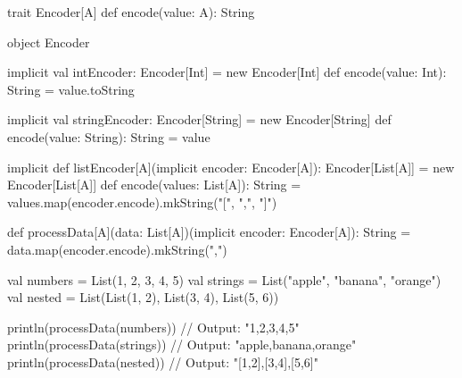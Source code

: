 trait Encoder[A] {
  def encode(value: A): String
}

object Encoder {
  implicit val intEncoder: Encoder[Int] = new Encoder[Int] {
    def encode(value: Int): String = value.toString
  }

  implicit val stringEncoder: Encoder[String] = new Encoder[String] {
    def encode(value: String): String = value
  }

  implicit def listEncoder[A](implicit encoder: Encoder[A]): Encoder[List[A]] = new Encoder[List[A]] {
    def encode(values: List[A]): String = values.map(encoder.encode).mkString("[", ",", "]")
  }
}

def processData[A](data: List[A])(implicit encoder: Encoder[A]): String =
  data.map(encoder.encode).mkString(",")

val numbers = List(1, 2, 3, 4, 5)
val strings = List("apple", "banana", "orange")
val nested = List(List(1, 2), List(3, 4), List(5, 6))

println(processData(numbers)) // Output: "1,2,3,4,5"
println(processData(strings)) // Output: "apple,banana,orange"
println(processData(nested)) // Output: "[1,2],[3,4],[5,6]"